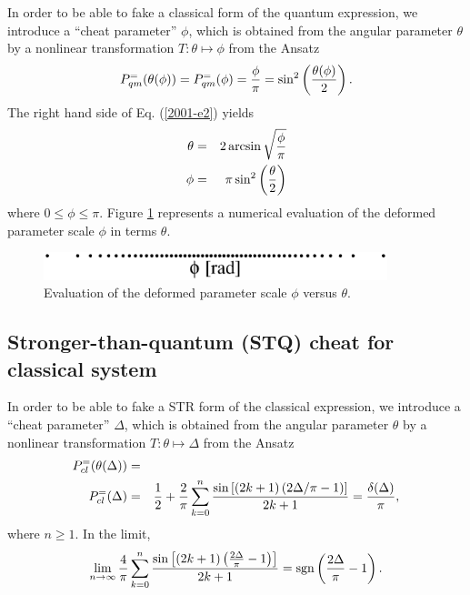 In order to be able to fake
a classical form of the quantum expression,
we introduce a ``cheat parameter'' $\phi $,
which is obtained from the angular parameter $\theta $
by a nonlinear transformation
$T:\theta \mapsto \phi$
from the Ansatz
\begin{equation}
P^{=}_{qm}(\theta (\phi ))
=
P^{=}_{qm}(\phi )
=
{\phi \over \pi}=
\sin^2 \left({\theta (\phi ) \over 2}\right).
\label{2001-e2}
\end{equation}
The right hand side of Eq. (\ref{2001-e2})
yields
\begin{eqnarray}
\theta &=& 2\arcsin \sqrt{{\phi \over \pi}}\\
\phi &=& \pi \sin^2 \left({\theta \over 2} \right)
\end{eqnarray}
where $0\le \phi  \le \pi$.
Figure   \ref{2001-cheat-f2} represents a numerical evaluation
of the deformed parameter scale $\phi$ in terms $\theta$.
\begin{figure}
\begin{center}
 \includegraphics[width=10cm]{2001-cesena-f5.eps}
\end{center}
 \caption{Evaluation of the deformed parameter scale $\phi$ versus $\theta$.}
\label{2001-cheat-f2}
\end{figure}



\subsection{Stronger-than-quantum (STQ) cheat for classical system}

In order to be able to fake
a STR form of the classical expression,
we introduce a ``cheat parameter'' $\Delta $,
which is obtained from the angular parameter $\theta $
by a nonlinear transformation
$T:\theta \mapsto \Delta$
from the Ansatz
\begin{eqnarray}
P^{=}_{cl}(\theta (\Delta ))
&=&
\nonumber \\
P^{=}_{cl}(\Delta )
&=&
{1\over 2}
+
{2\over \pi}
\sum_{k=0}^n
{
\sin \left[(2k+1)\left({2\Delta/ \pi}-1\right) \right]
\over 2k+1}
=
{\delta (\Delta )\over \pi }
,
\label{2001-e3}
\end{eqnarray}
where $n\ge 1$.
In the limit,
$$\lim_{n\rightarrow \infty}
{4\over \pi}
\sum_{k=0}^n
{
\sin \left[(2k+1)\left({2\Delta \over \pi}-1\right) \right]
\over 2k+1}
=
{\rm sgn}\left({2\Delta \over \pi}-1\right).
$$

